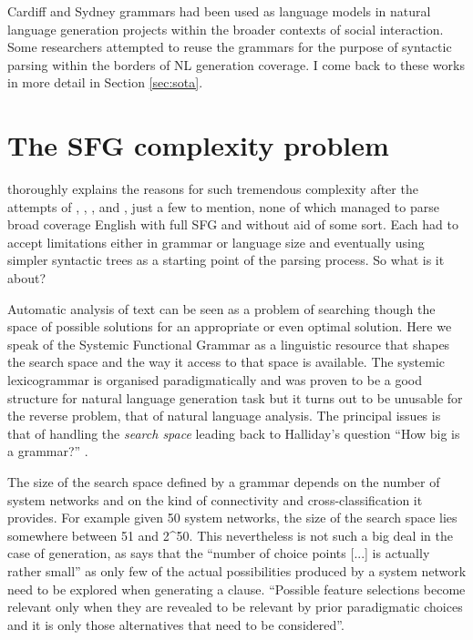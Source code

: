 Cardiff and Sydney grammars had been used as language models in natural language generation projects within 
the broader contexts of social interaction. Some researchers \citep{Kasper1988, ODonoghue1991a, ODonnell1993, Souter1996, Day2007} attempted to reuse the grammars for the purpose of syntactic parsing within the borders of NL generation coverage. I come back to these works in more detail in Section \ref{sec:sota}.

\section{The SFG complexity problem}
\citet{Bateman2008} thoroughly explains the reasons for such tremendous complexity after the attempts of \citet{Kasper1988}, \citet{Kay1985}, \citet{ODonoghue1991a}, \citet{ODonnell1993} and \citet{Day2007}, just a few to mention, none of which managed to parse broad coverage English with full SFG and without aid of some sort. Each had to accept limitations either in grammar or language size and eventually using simpler syntactic trees as a starting point of the parsing process. So what is it about? 

Automatic analysis of text can be seen as a problem of searching though the space of possible solutions for an appropriate or even optimal solution. Here we speak of the Systemic Functional Grammar as a linguistic resource that shapes the search space and the way it access to that space is available. The systemic lexicogrammar is organised paradigmatically and was proven to be a good structure for natural language generation task but it turns out to be unusable for the reverse problem, that of natural language analysis. The principal issues is that of handling the \textit{search space} leading back to Halliday's question ``How big is a grammar?'' \citep{Halliday66-deep}.

The size of the search space defined by a grammar depends on the number of system networks and on the kind of connectivity and cross-classification it provides. For example given 50 system networks, the size of the search space lies somewhere between 51 and 2^{50}. This nevertheless is not such a big deal in the case of generation, as \citet{Halliday96-grammatics} says that the ``number of choice points [...] is actually rather small'' as only few of the actual possibilities produced by a system network need to be explored when generating a clause. ``Possible feature selections become relevant only when they are revealed to be relevant by prior paradigmatic choices and it is only those alternatives that need to be considered''\citep{Bateman2008}.

